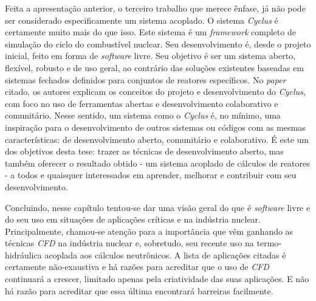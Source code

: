 Feita a apresentação anterior, o terceiro trabalho que merece ênfase, já não pode ser considerado
especificamente um sistema acoplado. O sistema \textit{Cyclus} \cite{Huff2016} é certamente muito mais
do que isso. Este sistema é um \textit{framework} completo de simulação do ciclo do combustível nuclear.
Seu desenvolvimento é, desde o projeto inicial, feito em forma de \textit{software} livre. Seu objetivo é ser um sistema aberto,
flexível, robusto e de uso geral, ao contrário das soluções existentes baseadas em sistemas fechados
definidos para conjuntos de reatores específicos.
No \textit{paper} citado, os autores explicam os conceitos do projeto e desenvolvimento do \textit{Cyclus}, com
foco no uso de ferramentas abertas e desenvolvimento colaborativo e comunitário. Nesse sentido, um sistema
como o \textit{Cyclus} é, no mínimo, uma inspiração para o desenvolvimento de outros sistemas ou códigos
com as mesmas características: de desenvolvimento aberto, comunitário e colaborativo. É este um dos objetivos
desta tese: trazer as técnicas de desenvolvimento aberto, mas também oferecer o resultado obtido -
um sistema acoplado de cálculos de reatores - a todos e quaisquer interessados em aprender, melhorar
e contribuir com seu desenvolvimento.

Concluindo, nesse capítulo tentou-se dar uma visão geral do que é \textit{software} livre e do
seu uso em situações de aplicações
críticas e na indústria nuclear. Principalmente, chamou-se atenção para a importância que vêm ganhando as
técnicas \textit{CFD} na indústria nuclear e, sobretudo, seu recente uso na termo-hidráulica acoplada aos cálculos
neutrônicos. A lista de aplicações citadas é certamente não-exaustiva e há razões para
acreditar que o uso de \textit{CFD} continuará a crescer, limitado apenas pela criatividade
das suas aplicações. E não há razão para acreditar que essa última encontrará barreiras
facilmente.




%

%    
%    


